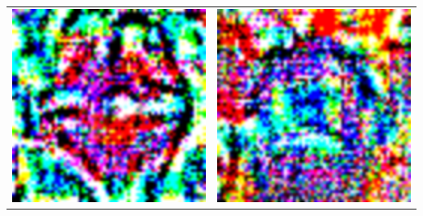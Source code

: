 \begin{table}
	\centering
\begin{tabular}{p{4.4cm}p{4.4cm}}
	\centering
	\includegraphics[width=\linewidth]{Images/AnPe/17_Einfahrtverbot} &\includegraphics[width=\linewidth]{Images/AnPe/34_kreisverkehr_origTurnleft}  \\

\end{tabular}
\end{table}
